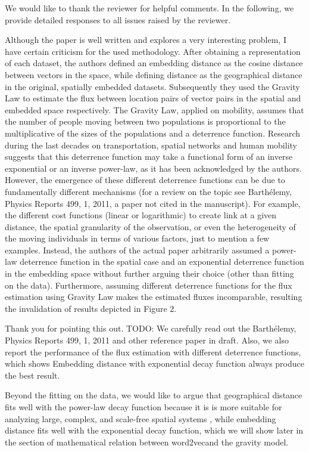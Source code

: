 \documentclass[12pt,a4paper]{article}
\newcommand{\response}[1]{{\leavevmode\noindent #1}}
\newcommand{\rcomment}[1]{%
\vspace{10pt}
\begin{tcolorbox}[colback=black!3,colframe=white!45!black]
#1
\end{tcolorbox}
}
\begin{document}
\response{%
We would like to thank the reviewer for helpful comments. 
In the following, we provide detailed responses to all issues raised by the reviewer.
}

\rcomment{%
Although the paper is well written and explores a very interesting problem, I have certain criticism for the used methodology. After obtaining a representation of each dataset, the authors defined an embedding distance as the cosine distance between vectors in the space, while defining distance as the geographical distance in the original, spatially embedded datasets. Subsequently they used the Gravity Law to estimate the flux between location pairs of vector pairs in the spatial and embedded space respectively. The Gravity Law, applied on mobility, assumes that the number of people moving between two populations is proportional to the multiplicative of the sizes of the populations and a deterrence function. Research during the last decades on transportation, spatial networks and human mobility suggests that this deterrence function may take a functional form of an inverse exponential or an inverse power-law, as it has been acknowledged by the authors. However, the emergence of these different deterrence functions can be due to fundamentally different mechanisms (for a review on the topic see Barthélemy, Physics Reports 499, 1, 2011, a paper not cited in the manuscript). For example, the different cost functions (linear or logarithmic) to create link at a given distance, the spatial granularity of the observation, or even the heterogeneity of the moving individuals in terms of various factors, just to mention a few examples. Instead, the authors of the actual paper arbitrarily assumed a power-law deterrence function in the spatial case and an exponential deterrence function in the embedding space without further arguing their choice (other than fitting on the data). Furthermore, assuming different deterrence functions for the flux estimation using Gravity Law makes the estimated fluxes incomparable, resulting the invalidation of results depicted in Figure 2.
}

\response{%
Thank you for pointing this out. 
TODO:
We carefully read out the Barthélemy, Physics Reports 499, 1, 2011 and other reference paper in draft.
Also, we also report the performance of the flux estimation with different deterrence functions, which shows Embedding distance with exponential decay function always produce the best result.


Beyond the ﬁtting on the data, we would like to argue that geographical distance ﬁts well with the power-law decay function because it is is more suitable for analyzing large, complex, and scale-free spatial systems , while embedding distance ﬁts well with the exponential decay function, which we will show later in the section of mathematical relation between word2vecand the gravity model.
}
\end{document}
